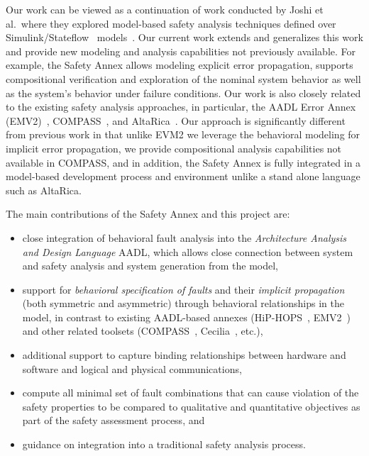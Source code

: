 Our work can be viewed as a continuation of work conducted by Joshi et al.~where they explored model-based safety analysis techniques defined over Simulink/Stateflow~\cite{MathWorks} models~\cite{Joshi05:SafeComp,Joshi07:Hase,Joshi05:Dasc,DBLP:conf/cav/BozzanoCPJKPRT15}. Our current work extends and generalizes this work and provide new modeling and analysis capabilities not previously available.  For example, the Safety Annex allows modeling explicit %
error propagation, supports compositional verification and exploration of the nominal system behavior as well as the system's behavior under failure conditions. Our work is also closely related to the existing safety analysis approaches, in particular, the AADL Error Annex (EMV2)~\cite{EMV2}, COMPASS~\cite{10.1007/978-3-642-04468-7_15}, and AltaRica~\cite{PROSVIRNOVA2013127,BieberERTS2018}. Our approach is significantly different from previous work in that unlike EVM2 we leverage the behavioral modeling for implicit %
error propagation, we provide compositional analysis capabilities not available in COMPASS, and in addition, the Safety Annex  is fully integrated in a model-based development process and environment unlike a stand alone language such as AltaRica. 

The main contributions of the Safety Annex and this project are:
\begin{itemize}
\renewcommand{\labelitemi}{\textbullet}
		\item close integration of behavioral fault analysis into the {\em Architecture Analysis and Design Language} AADL, which allows close connection between system and safety analysis and system generation from the model,
		\item support for {\em behavioral specification of faults} and their {\em implicit propagation} (both symmetric and asymmetric) through behavioral relationships in the model, in contrast to existing AADL-based annexes (HiP-HOPS~\cite{CHEN201391}, EMV2~\cite{EMV2}) and other related toolsets (COMPASS~\cite{10.1007/978-3-642-04468-7_15}, Cecilia~\cite{bieber2004safety}, etc.),
		\item additional support to capture binding relationships between hardware and software and logical and physical communications, %
		\item compute all minimal set of fault combinations that can cause violation of the safety properties to be compared to qualitative and quantitative objectives as part of the safety assessment process, and
		\item guidance on integration into a traditional safety analysis process.
\end{itemize}















